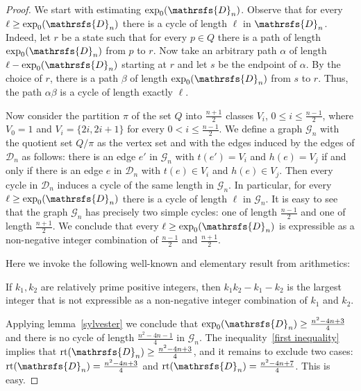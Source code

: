 \documentclass[11pt]{llncs}
\DeclareMathOperator{\rt}{rt}
\begin{document}
\begin{proof}
We start with estimating $\exp_0(\mathrsfs{D}_n)$. Observe that for every $\ell
\geq \exp_0(\mathrsfs{D}_n)$ there is a cycle of length $\ell$ in
$\mathrsfs{D}_n$. Indeed, let $r$ be a state such that for every $p \in Q$
there is a path of length $\exp_0(\mathrsfs{D}_n)$ from $p$ to $r$. Now take an
arbitrary path $\alpha$ of length $\ell - \exp_0(\mathrsfs{D}_n)$ starting at
$r$ and let $s$ be the endpoint of $\alpha$. By the choice of $r$, there is a
path $\beta$ of length $\exp_0(\mathrsfs{D}_n)$ from $s$ to $r$. Thus, the path
$\alpha\beta$ is a cycle of length exactly $\ell$.

Now consider the partition $\pi$ of the set $Q$ into $\frac{n+1}{2}$ classes
$V_i$, $0\le i \le \frac{n - 1}{2}$, where $V_0 = {1}$ and $V_i = \{2i,2i+1\}$
for every $0 < i \le \frac{n - 1}{2}$. We define a graph $\mathcal{G}_n$ with
the quotient set $Q/\pi$ as the vertex set and with the edges induced by the
edges of  $\mathcal{D}_n$ as follows: there is an edge $e'$ in $\mathcal{G}_n$
with $t(e') = V_i$ and $h(e) = V_j$ if and only if there is an edge $e$ in
$\mathcal{D}_n$ with $t(e)\in V_i$ and $h(e) \in V_j$. Then every cycle in
$\mathcal{D}_n$ induces a cycle of the same length in $\mathcal{G}_n$. In
particular,  for every $\ell \ge \exp_0(\mathrsfs{D}_n)$ there is a cycle of
length $\ell$ in $\mathcal{G}_n$. It is easy to see that the graph
$\mathcal{G}_n$ has precisely two simple cycles: one of length $\frac{n -
1}{2}$ and one of length $\frac{n + 1}{2}$. We conclude that every $\ell\ge
\exp_0(\mathrsfs{D}_n)$ is expressible as a non-negative integer combination of
$\frac{n - 1}{2}$ and $\frac{n + 1}{2}$.

Here we invoke the following well-known and elementary result from arithmetics:
\begin{lemma}
\label{sylvester} If $k_1,k_2$ are relatively prime positive integers, then
$k_1k_2-k_1-k_2$ is the largest integer that is not expressible as a
non-negative integer combination of $k_1$ and $k_2$.
\end{lemma}
Applying lemma~\ref{sylvester} we conclude that $\exp_0(\mathrsfs{D}_n) \geq
\frac{n^2 -4n + 3}{4}$ and there is no cycle of length $\frac{n^2 -4n - 1}{4}$
in $\mathcal{G}_n$. The inequality~\ref{first inequality} implies that
$\rt(\mathrsfs{D}_n) \geq \frac{n^2 -4n + 3}{4}$, and it remains to exclude two
cases: $\rt(\mathrsfs{D}_n)= \frac{n^2 -4n + 3}{4}$ and $\rt(\mathrsfs{D}_n) =
\frac{n^2 -4n + 7}{4}$. This is easy.


\end{proof}
\end{document}
